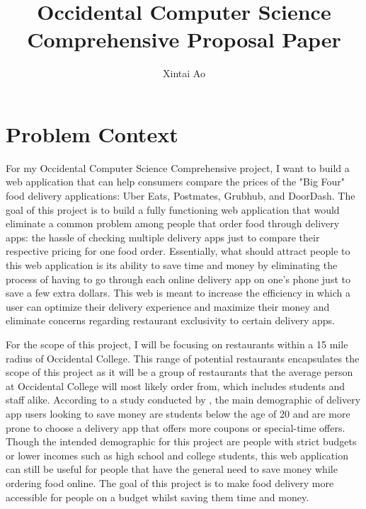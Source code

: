 \documentclass[10pt,twocolumn]{article}
\title{Occidental Computer Science Comprehensive Proposal Paper}
\author{Xintai Ao}
\affiliation{Occidental College}
\begin{document}
\maketitle
\section{Problem Context}

For my Occidental Computer Science Comprehensive project, I want to build a web application that can help consumers compare the prices of the "Big Four" food delivery applications: Uber Eats, Postmates, Grubhub, and DoorDash. The goal of this project is to build a fully functioning web application that would eliminate a common problem among people that order food through delivery apps: the hassle of checking multiple delivery apps just to compare their respective pricing for one food order. Essentially, what should attract people to this web application is its ability to save time and money by eliminating the process of having to go through each online delivery app on one's phone just to save a few extra dollars. This web is meant to increase the efficiency in which a user can optimize their delivery experience and maximize their money and eliminate concerns regarding restaurant exclusivity to certain delivery apps. 

For the scope of this project, I will be focusing on restaurants within a 15 mile radius of Occidental College. This range of potential restaurants encapsulates the scope of this project as it will be a group of restaurants that the average person at Occidental College will most likely order from, which includes students and staff alike. According to a study conducted by , the main demographic of delivery app users looking to save money are students below the age of 20 and are more prone to choose a delivery app that offers more coupons or special-time offers. Though the intended demographic for this project are people with strict budgets or lower incomes such as high school and college students, this web application can still be useful for people that have the general need to save money while ordering food online. The goal of this project is to make food delivery more accessible for people on a budget whilst saving them time and money. 
\end{document}
